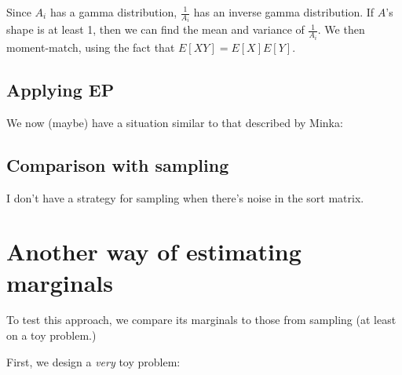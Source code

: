 \documentclass{article}\usepackage[]{graphicx}\usepackage[]{color}
\begin{document}
Since $A_i$ has a gamma distribution, $\frac{1}{A_i}$ has
an inverse gamma distribution. If $A$'s shape is at least
1, then we can find the mean and variance of $\frac{1}{A_i}$.
We then moment-match, using the fact that $E[XY] = E[X]E[Y]$.



\subsection{Applying EP}

We now (maybe) have a situation similar to that
described by Minka: 







\subsection{Comparison with sampling}




I don't have a strategy for sampling when there's noise
in the sort matrix.



\section{Another way of estimating marginals}


To test this approach, we compare its marginals to those from
sampling (at least on a toy problem.)

First, we design a {\em very} toy problem:
\end{document}
